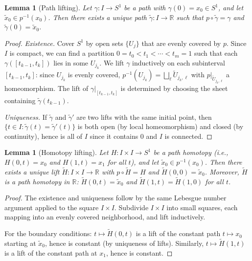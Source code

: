 \documentclass[12pt,a4paper,openany]{book}
\theoremstyle{definition}
\theoremstyle{plain}
\newtheorem{lemma}[definition]{Lemma}
\theoremstyle{remark}
\newcommand{\R}{\mathbb{R}}
\begin{document}
\begin{lemma}[Path lifting]\label{lem:path-lifting}
Let $\gamma \colon I \to S^1$ be a path with $\gamma(0) = x_0 \in S^1$, and
let $\tilde{x}_0 \in p^{-1}(x_0)$. Then there exists a unique path
$\tilde{\gamma} \colon I \to \R$ such that $p \circ \tilde{\gamma} = \gamma$
and $\tilde{\gamma}(0) = \tilde{x}_0$.
\end{lemma}

\begin{proof}
\emph{Existence.} Cover $S^1$ by open sets $\{U_j\}$ that are evenly covered by
$p$. Since $I$ is compact, we can find a partition $0 = t_0 < t_1 < \cdots < t_m
= 1$ such that each $\gamma([t_{k-1}, t_k])$ lies in some $U_{j_k}$. We lift
$\gamma$ inductively on each subinterval $[t_{k-1}, t_k]$: since $U_{j_k}$ is
evenly covered, $p^{-1}(U_{j_k}) = \bigsqcup_\ell \tilde{U}_{j_k,\ell}$ with
$p|_{\tilde{U}_{j_k,\ell}}$ a homeomorphism. The lift of $\gamma|_{[t_{k-1},
t_k]}$ is determined by choosing the sheet containing $\tilde{\gamma}(t_{k-1})$.

\emph{Uniqueness.} If $\tilde{\gamma}$ and $\tilde{\gamma}'$ are two lifts with
the same initial point, then $\{t \in I : \tilde{\gamma}(t) =
\tilde{\gamma}'(t)\}$ is both open (by local homeomorphism) and closed (by
continuity), hence is all of $I$ since it contains $0$ and $I$ is connected.
\end{proof}

\begin{lemma}[Homotopy lifting]\label{lem:homotopy-lifting}
Let $H \colon I \times I \to S^1$ be a path homotopy (i.e., $H(0,t) = x_0$ and
$H(1,t) = x_1$ for all $t$), and let $\tilde{x}_0 \in p^{-1}(x_0)$. Then there
exists a unique lift $\tilde{H} \colon I \times I \to \R$ with $p \circ
\tilde{H} = H$ and $\tilde{H}(0,0) = \tilde{x}_0$. Moreover, $\tilde{H}$ is a
path homotopy in $\R$: $\tilde{H}(0, t) = \tilde{x}_0$ and $\tilde{H}(1, t) =
\tilde{H}(1, 0)$ for all $t$.
\end{lemma}

\begin{proof}
The existence and uniqueness follow by the same Lebesgue number argument applied
to the square $I \times I$. Subdivide $I \times I$ into small squares, each
mapping into an evenly covered neighborhood, and lift inductively.

For the boundary conditions: $t \mapsto \tilde{H}(0, t)$ is a lift of the
constant path $t \mapsto x_0$ starting at $\tilde{x}_0$, hence is constant (by
uniqueness of lifts). Similarly, $t \mapsto \tilde{H}(1, t)$ is a lift of the
constant path at $x_1$, hence is constant.
\end{proof}
\end{document}
